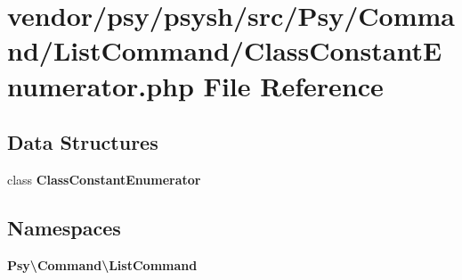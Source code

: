 \section{vendor/psy/psysh/src/\+Psy/\+Command/\+List\+Command/\+Class\+Constant\+Enumerator.php File Reference}
\label{_class_constant_enumerator_8php}
\subsection*{Data Structures}
\begin{DoxyCompactItemize}
\item 
class {\bf Class\+Constant\+Enumerator}
\end{DoxyCompactItemize}
\subsection*{Namespaces}
\begin{DoxyCompactItemize}
\item 
 {\bf Psy\textbackslash{}\+Command\textbackslash{}\+List\+Command}
\end{DoxyCompactItemize}

